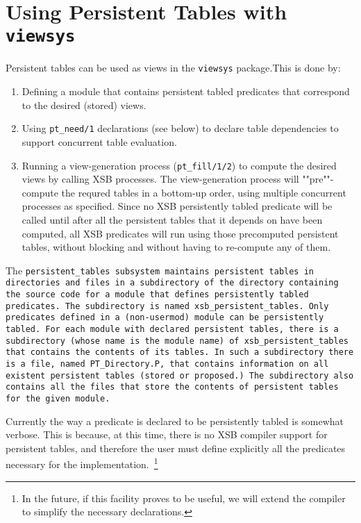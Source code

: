 
\section{Using Persistent Tables with {\tt viewsys}}

Persistent tables can be used as views in the {\tt viewsys}
package.This is done by:

\begin{enumerate}

\item Defining a module that contains persistent tabled predicates
that correspond to the desired (stored) views.

\item Using {\tt pt\_need/1} declarations (see below) to declare table
dependencies to support concurrent table evaluation.

\item Running a view-generation process ({\tt pt\_fill/1/2}) to
compute the desired views by calling XSB processes.  The
view-generation process will ""pre""-compute the requred tables in a
bottom-up order, using multiple concurrent processes as specified.
Since no XSB persistently tabled predicate will be called until after
all the persistent tables that it depends on have been computed, all
XSB predicates will run using those precomputed persistent tables,
without blocking and without having to re-compute any of them.

\end{enumerate}

The \tt{persistent\_tables} subsystem maintains persistent tables in
directories and files in a subdirectory of the directory containing
the source code for a module that defines persistently tabled
predicates.  The subdirectory is named {\tt xsb\_persistent\_tables}.
Only predicates defined in a (non-usermod) module can be persistently
tabled.  For each module with declared persistent tables, there is a
subdirectory (whose name is the module name) of
{\tt xsb\_persistent\_tables} that contains the contents of its
tables.  In such a subdirectory there is a file, named
{\tt PT\_Directory.P}, that contains information on all existent
persistent tables (stored or proposed.)  The subdirectory also
contains all the files that store the contents of persistent tables
for the given module.

Currently the way a predicate is declared to be persistently tabled is
somewhat verbose.  This is because, at this time, there is no XSB
compiler support for persistent tables, and therefore the user must
define explicitly all the predicates necessary for the
implementation.~\footnote{In the future, if this facility proves to be
  useful, we will extend the compiler to simplify the necessary
  declarations.}

